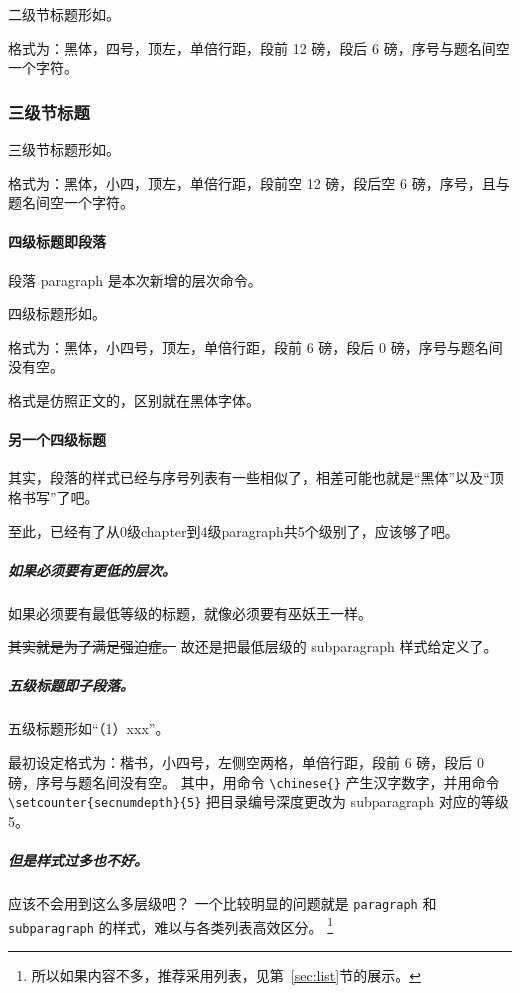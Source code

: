 \documentclass[../Main/thesis]{subfiles}
\begin{document}
二级节标题形如。

格式为：黑体，四号，顶左，单倍行距，段前 12 磅，段后 6 磅，序号与题名间空一个字符。

\subsubsection{三级节标题} \label{sss:subsub3}

三级节标题形如。

格式为：黑体，小四，顶左，单倍行距，段前空 12 磅，段后空 6 磅，序号，且与题名间空一个字符。

\paragraph{四级标题即段落} \label{par:par4}

段落 paragraph 是本次新增的层次命令。

四级标题形如。

格式为：黑体，小四号，顶左，单倍行距，段前 6 磅，段后 0 磅，序号与题名间没有空。

格式是仿照正文的，区别就在黑体字体。

\paragraph{另一个四级标题} \label{spr:subpar}

其实，段落的样式已经与序号列表有一些相似了，相差可能也就是“黑体”以及“顶格书写”了吧。

至此，已经有了从0级chapter到4级paragraph共5个级别了，应该够了吧。

\subparagraph{如果必须要有更低的层次。\\}
如果必须要有最低等级的标题，就像必须要有巫妖王一样。

\sout{其实就是为了满足强迫症。}
故还是把最低层级的 subparagraph 样式给定义了。

\subparagraph{五级标题即子段落。}
五级标题形如“（1）xxx”。

最初设定格式为：楷书，小四号，左侧空两格，单倍行距，段前 6 磅，段后 0 磅，序号与题名间没有空。
其中，用命令 \verb|\chinese{}| 产生汉字数字，并用命令 \verb|\setcounter{secnumdepth}{5}| 把目录编号深度更改为 subparagraph 对应的等级 5。

\subparagraph{但是样式过多也不好。}
应该不会用到这么多层级吧？
一个比较明显的问题就是 \verb|paragraph| 和 \verb|subparagraph| 的样式，难以与各类列表高效区分。
\footnote{所以如果内容不多，推荐采用列表，见第~\ref{sec:list}节的展示。}
\end{document}
